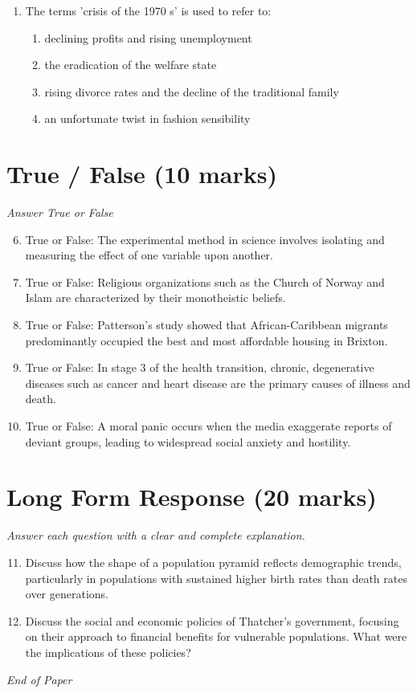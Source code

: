 \documentclass[12pt]{article}
\begin{document}
\begin{enumerate}[label=\arabic*.]
\begin{enumerate}[label=(\alph*)]
    \item shared ideas and moral values, often symbolized by an object or figurehead
    \item ideological tools used to obscure class divisions
\end{enumerate}
\item The terms 'crisis of the 1970 s' is used to refer to:
\begin{enumerate}[label=(\alph*)]
    \item declining profits and rising unemployment
    \item the eradication of the welfare state
    \item rising divorce rates and the decline of the traditional family
    \item an unfortunate twist in fashion sensibility
\end{enumerate}
\end{enumerate}

\section*{True / False (10 marks)}
\textit{Answer True or False}
\begin{enumerate}[label=\arabic*.]
\setcounter{enumi}{5}
\item True or False: The experimental method in science involves isolating and measuring the effect of one variable upon another.
\item True or False: Religious organizations such as the Church of Norway and Islam are characterized by their monotheistic beliefs.
\item True or False: Patterson's study showed that African-Caribbean migrants predominantly occupied the best and most affordable housing in Brixton.
\item True or False: In stage 3 of the health transition, chronic, degenerative diseases such as cancer and heart disease are the primary causes of illness and death.
\item True or False: A moral panic occurs when the media exaggerate reports of deviant groups, leading to widespread social anxiety and hostility.
\end{enumerate}

\section*{Long Form Response (20 marks)}
\textit{Answer each question with a clear and complete explanation.}
\begin{enumerate}[label=\arabic*.]
\setcounter{enumi}{10}
\item Discuss how the shape of a population pyramid reflects demographic trends, particularly in populations with sustained higher birth rates than death rates over generations.
\item Discuss the social and economic policies of Thatcher's government, focusing on their approach to financial benefits for vulnerable populations. What were the implications of these policies?
\end{enumerate}

\vfill
\noindent\textit{End of Paper}
\end{document}

